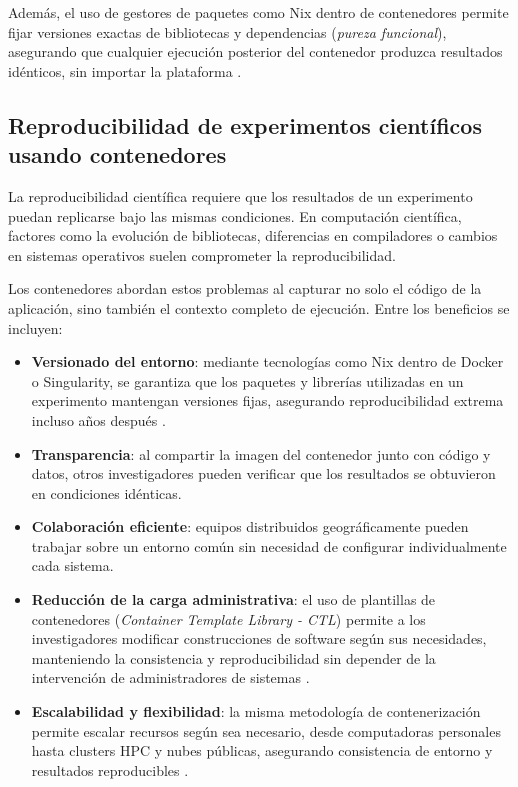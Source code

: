 Además, el uso de gestores de paquetes como Nix dentro de contenedores permite fijar versiones exactas de bibliotecas y dependencias (\textit{pureza funcional}), asegurando que cualquier ejecución posterior del contenedor produzca resultados idénticos, sin importar la plataforma \cite{Vaillancourt2020SelfScalingCA}.

\subsection{Reproducibilidad de experimentos científicos usando contenedores}

La reproducibilidad científica requiere que los resultados de un experimento puedan replicarse bajo las mismas condiciones. En computación científica, factores como la evolución de bibliotecas, diferencias en compiladores o cambios en sistemas operativos suelen comprometer la reproducibilidad.

Los contenedores abordan estos problemas al capturar no solo el código de la aplicación, sino también el contexto completo de ejecución. Entre los beneficios se incluyen:

\begin{itemize}
    \item \textbf{Versionado del entorno}: mediante tecnologías como Nix dentro de Docker o Singularity, se garantiza que los paquetes y librerías utilizadas en un experimento mantengan versiones fijas, asegurando reproducibilidad extrema incluso años después \cite{Vaillancourt2020SelfScalingCA}.
    \item \textbf{Transparencia}: al compartir la imagen del contenedor junto con código y datos, otros investigadores pueden verificar que los resultados se obtuvieron en condiciones idénticas.
    \item \textbf{Colaboración eficiente}: equipos distribuidos geográficamente pueden trabajar sobre un entorno común sin necesidad de configurar individualmente cada sistema.
    \item \textbf{Reducción de la carga administrativa}: el uso de plantillas de contenedores (\textit{Container Template Library - CTL}) permite a los investigadores modificar construcciones de software según sus necesidades, manteniendo la consistencia y reproducibilidad sin depender de la intervención de administradores de sistemas \cite{Vaillancourt2020SelfScalingCA}.
    \item \textbf{Escalabilidad y flexibilidad}: la misma metodología de contenerización permite escalar recursos según sea necesario, desde computadoras personales hasta clusters HPC y nubes públicas, asegurando consistencia de entorno y resultados reproducibles \cite{Vaillancourt2020SelfScalingCA}.
\end{itemize}


